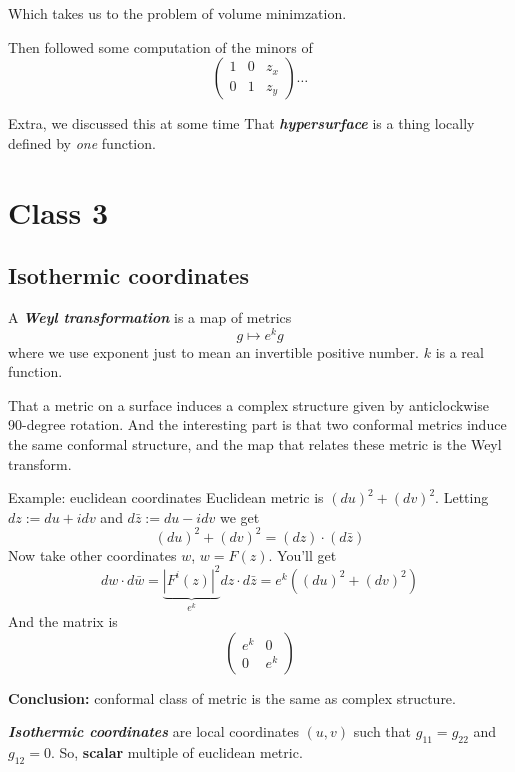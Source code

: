 Which takes us to the problem of volume minimzation.

Then followed some computation of the minors of
\[\begin{pmatrix} 1&0&z_x\\0&1&z_y \end{pmatrix}\ldots \]

\begin{thing6}{Extra, we discussed this at some time}\leavevmode
That \textit{\textbf{hypersurface}} is a thing locally defined by \textit{one} function.
\end{thing6}

\section{Class 3}

\subsection{Isothermic coordinates}

A \textit{\textbf{Weyl transformation}} is a map of metrics
\[g \mapsto  e^kg\]
where we use exponent just to mean an invertible positive number. \(k\) is a real function.

\begin{upshot}\leavevmode
That a metric on a surface induces a complex structure given by anticlockwise 90-degree rotation. And the interesting part is that two conformal metrics induce the same conformal structure, and the map that relates these metric is the Weyl transform.
\end{upshot}

\begin{thing8}{Example: euclidean coordinates}\leavevmode
Euclidean metric is \((du)^2+(dv)^2\). Letting \(dz:=du+idv\) and \(d\bar{z}:=du-i dv\) we get
\[(du)^2+(dv)^2=(dz)\cdot(d\bar{z})\]
Now take other coordinates \(w\), \(w=F(z)\).  You'll get
\[dw\cdot d \bar{w}=\underbrace{|F^i(z)|^2}_{e^k}dz\cdot d\bar{z}=e^k((du)^2+(dv)^2)\]
And the matrix is
\[\begin{pmatrix}e^k&0\\ 0&e^k\end{pmatrix}\]

\textbf{Conclusion:} conformal class of metric is the same as complex structure.
\end{thing8}

\begin{defn}\leavevmode
\textit{\textbf{Isothermic coordinates}} are local coordinates \((u,v)\) such that \(g_{11}=g_{22}\) and \(g_{12}=0\). So,  \textbf{scalar} multiple of euclidean metric.
\end{defn}



